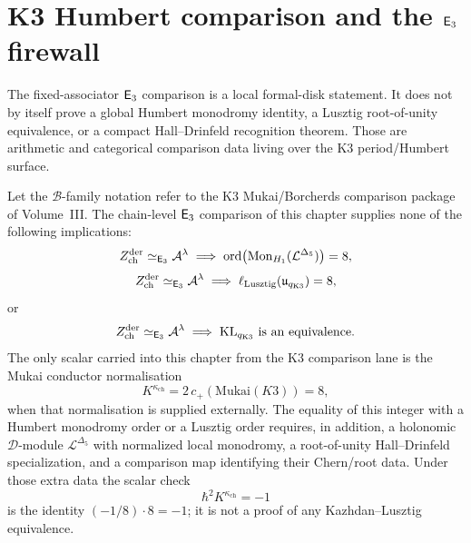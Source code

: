 \section{K3 Humbert comparison and the $\mathsf{E}_3$ firewall}
\label{sec:kl-humbert-eighth-root}

The fixed-associator $\mathsf{E}_3$ comparison is a local formal-disk
statement. It does not by itself prove a global Humbert monodromy
identity, a Lusztig root-of-unity equivalence, or a compact
Hall--Drinfeld recognition theorem. Those are arithmetic and
categorical comparison data living over the K3 period/Humbert
surface.

\begin{theorem}
\label{thm:humbert-lusztig-mukai-8}
\ClaimStatusConditional
{}
Let the $\mathcal{B}$-family notation refer to the K3
Mukai/Borcherds comparison package of Volume~III. The
chain-level $\mathsf{E}_3$ comparison of this chapter supplies none of
the following implications:
\[
 Z^{\mathrm{der}}_{\mathrm{ch}}\simeq_{\mathsf{E}_3}\mathcal{A}^\lambda
 \;\Longrightarrow\;
 \mathrm{ord}\bigl(\mathrm{Mon}_{H_1}(\mathcal L^{\Delta_5})\bigr)=8,
\]
\[
 Z^{\mathrm{der}}_{\mathrm{ch}}\simeq_{\mathsf{E}_3}\mathcal{A}^\lambda
 \;\Longrightarrow\;
 \ell_{\mathrm{Lusztig}}(\mathfrak u_{q_{\mathrm{K3}}})=8,
\]
or
\[
 Z^{\mathrm{der}}_{\mathrm{ch}}\simeq_{\mathsf{E}_3}\mathcal{A}^\lambda
 \;\Longrightarrow\;
 \mathrm{KL}_{q_{\mathrm{K3}}}\text{ is an equivalence.}
\]
The only scalar carried into this chapter from the K3 comparison
lane is the Mukai conductor normalisation
\[
 K^{\kappa_{\mathrm{ch}}}
 =
 2\,c_+(\mathrm{Mukai}(K3))
 =
 8,
\]
when that normalisation is supplied externally. The equality of this
integer with a Humbert monodromy order or a Lusztig order requires,
in addition, a holonomic $\mathcal D$-module
$\mathcal L^{\Delta_5}$ with normalized local monodromy, a
root-of-unity Hall--Drinfeld specialization, and a comparison map
identifying their Chern/root data. Under those extra data the scalar
check
\[
 \hbar^2 K^{\kappa_{\mathrm{ch}}}=-1
\]
is the identity $(-1/8)\cdot 8=-1$; it is not a proof of any
Kazhdan--Lusztig equivalence.
\end{theorem}

